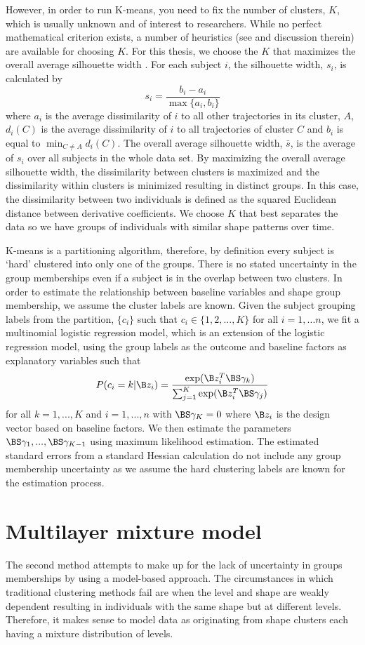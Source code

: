 However, in order to run K-means, you need to fix the number of clusters, $K$, which is usually unknown and of interest to researchers. While no perfect mathematical criterion exists, a number of heuristics (see \cite{tibshirani2001} and discussion therein) are available for choosing $K$. For this thesis, we choose the $K$ that maximizes the overall average silhouette width \cite{rousseeuw1987}.  For each subject $i$, the silhouette width, $s_{i}$, is calculated by
$$s_{i}=\frac{b_{i}-a_{i}}{\max\{a_{i},b_{i}\}}$$
where $a_{i}$ is the average dissimilarity of $i$ to all other trajectories in its cluster, $A$, $d_{i}(C)$ is the average dissimilarity of $i$ to all trajectories of cluster $C$ and $b_{i}$ is equal to $\min_{C\not= A} d_{i}(C)$. The overall average silhouette width, $\bar{s}$, is the average of $s_{i}$ over all subjects in the whole data set. By maximizing the overall average silhouette width, the dissimilarity between clusters is maximized and the dissimilarity within clusters is minimized resulting in distinct groups. In this case, the dissimilarity between two individuals is defined as the squared Euclidean distance between derivative coefficients. We choose $K$ that best separates the data so we have groups of individuals with similar shape patterns over time.

K-means is a partitioning algorithm, therefore, by definition every subject is `hard' clustered into only one of the groups. There is no stated uncertainty in the group memberships even if a subject is in the overlap between two clusters. In order to estimate the relationship between baseline variables and shape group membership, we assume the cluster labels are known. Given the subject grouping labels from the partition, $\{c_{i}\}$ such that $c_{i}\in\{1,2,...,K\}$ for all $i=1,...n$, we fit a multinomial logistic regression model, which is an extension of the logistic regression model, using the group labels as the outcome and baseline factors as explanatory variables such that
$$P(c_{i} = k|\B z_{i}) = \frac{\exp(\B z_{i}^{T}\BS\gamma_{k})}{\sum_{j=1}^{K}\exp(\B z_{i}^{T}\BS\gamma_{j})}$$
for all $k=1,...,K$ and $i=1,...,n$ with $\BS\gamma_{K}=0$ where $\B z_{i}$ is the design vector based on baseline factors. We then estimate the parameters $\BS\gamma_{1},...,\BS\gamma_{K-1}$ using maximum likelihood estimation. The estimated standard errors from a standard Hessian calculation do not include any group membership uncertainty  as we assume the hard clustering labels are known for the estimation process.
\section{Multilayer mixture model}
The second method attempts to make up for the lack of uncertainty in groups memberships by using a model-based approach. The circumstances in which traditional clustering methods fail are when the level and shape are weakly dependent resulting in individuals with the same shape but at different levels. Therefore, it makes sense to model data as originating from shape clusters each having a mixture distribution of levels.
